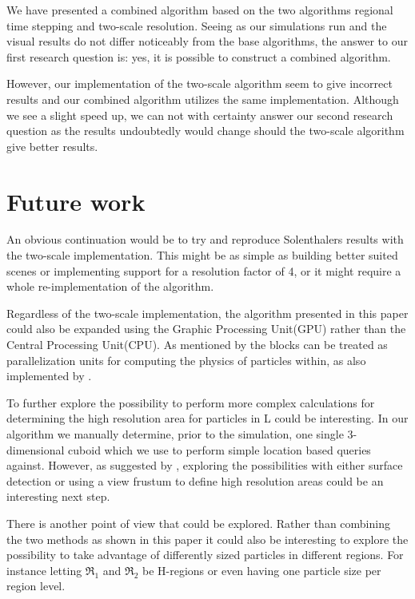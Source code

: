 \documentclass[../../main.tex]{subfiles}
\begin{document}
\tracingall



We have presented a combined algorithm based on the two algorithms regional time stepping and two-scale resolution. Seeing as our simulations run and the visual results do not differ noticeably from the base algorithms, the answer to our first research question is: yes, it is possible to construct a combined algorithm. 

However, our implementation of the two-scale algorithm seem to give incorrect results and our combined algorithm utilizes the same implementation. Although we see a slight speed up, we can not with certainty answer our second research question as the results undoubtedly would change should the two-scale algorithm give better results. 


\section{Future work}

An obvious continuation would be to try and reproduce Solenthalers results with the two-scale implementation. This might be as simple as building better suited scenes or implementing support for a resolution factor of 4, or it might require a whole re-implementation of the algorithm. 

Regardless of the two-scale implementation, the algorithm presented in this paper could also be expanded using the Graphic Processing Unit(GPU) rather than the Central Processing Unit(CPU). As mentioned by \citet{goswami2014regional} the blocks can be treated as parallelization units for computing the physics of particles within, as also implemented by \citet{goswami2010interactive}.

To further explore the possibility to perform more complex calculations for determining the high resolution area for particles in L could be interesting. In our algorithm we manually determine, prior to the simulation, one single 3-dimensional cuboid which we use to perform simple location based queries against. However, as suggested by \citet{solenthaler2011two}, exploring the possibilities with either surface detection or using a view frustum to define high resolution areas could be an interesting next step. 

There is another point of view that could be explored. Rather than combining the two methods as shown in this paper it could also be interesting to explore the possibility to take advantage of differently sized particles in different regions. For instance letting $\Re_1$ and $\Re_2$ be H-regions or even having one particle size per region level. 
\end{document}

